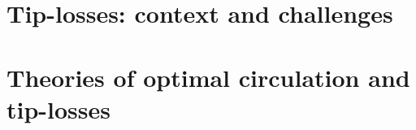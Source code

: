 \documentclass[a4paper,11pt]{book}
\begin{document}
% 






\myrhead{\leftmark}


\newpage




\chapter{Tip-losses: context and challenges }



\chapter{Theories of optimal circulation and tip-losses}

\end{document}
